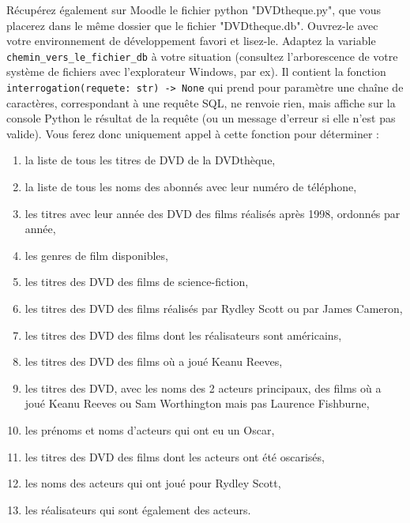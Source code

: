 \documentclass[11pt,a4paper,french,twoside]{PMCours}
\begin{document}
Récupérez également sur Moodle le fichier python "DVDtheque.py", que vous placerez dans le même dossier que le fichier "DVDtheque.db". Ouvrez-le avec votre environnement de développement favori et lisez-le. Adaptez la variable \verb'chemin_vers_le_fichier_db' à votre situation (consultez l'arborescence de votre système de fichiers avec l'explorateur Windows, par ex). Il contient la fonction \verb'interrogation(requete: str) -> None' qui prend pour paramètre une chaîne de caractères, correspondant à une requête SQL, ne renvoie rien, mais affiche sur la console Python le résultat de la requête (ou un message d'erreur si elle n'est pas valide). Vous ferez donc uniquement appel à cette fonction pour déterminer : 
\begin{enumerate}
 \item la liste de tous les titres de DVD de la DVDthèque,
 \item la liste de tous les noms des abonnés avec leur numéro de téléphone,
 \item les titres avec leur année des DVD des films réalisés après 1998, ordonnés par année,
 \item les genres de film disponibles,
 \item les titres des DVD des films de science-fiction,
 \item les titres des DVD des films réalisés par Rydley Scott ou par James Cameron,
 \item les titres des DVD des films dont les réalisateurs sont américains,
 \item les titres des DVD des films où a joué Keanu Reeves,
 \item les titres des DVD, avec les noms des 2 acteurs principaux, des films où a joué Keanu Reeves ou Sam Worthington mais pas Laurence Fishburne,
 \item les prénoms et noms d'acteurs qui ont eu un Oscar,
 \item les titres des DVD des films dont les acteurs ont été oscarisés,
 \item les noms des acteurs qui ont joué pour Rydley Scott,
 \item les réalisateurs qui sont également des acteurs.
\end{enumerate}
\end{document}
